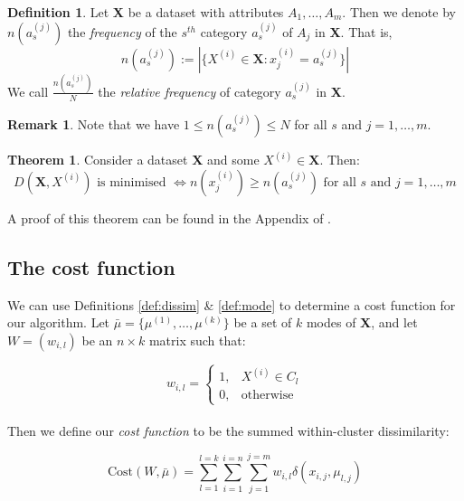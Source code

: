 \documentclass{article}
\theoremstyle{definition}
\newtheorem{definition}{Definition}[section]
\newtheorem{theorem}{Theorem}
\newtheorem*{remark}{Remark}
\begin{document}
\begin{definition}\label{def:rel-freq}
Let \textbf{X} be a dataset with attributes $A_1, \ldots, A_m$. Then we denote by $n(a_s^{(j)})$ the \emph{frequency} of the $s^{th}$ category $a_s^{(j)}$ of $A_j$ in \textbf{X}. That is, 
\[
	n(a_s^{(j)}) := |{\{X^{(i)} \in \textbf{X}: x_j^{(i)} = a_s^{(j)}\}}|
\]
We call $\frac{n(a_s^{(j)})}{N}$ the \emph{relative frequency} of category $a_s^{(j)}$ in \textbf{X}.
\end{definition}

\begin{remark}
	Note that we have $1 \le n(a_s^{(j)}) \le N$ for all $s$ and $j = 1, \ldots, m$. \\
\end{remark}

\begin{theorem}\label{theorem:1}
Consider a dataset \textbf{X} and some $X^{(i)} \in \textbf{X}$. Then: \\
\[
	D(\textbf{X}, X^{(i)}) \text{ is minimised } \iff n(x_j^{(i)}) \geq n(a_s^{(j)}) \text{ for all } s \text{ and } j = 1, \ldots, m 
\]
\end{theorem}
A proof of this theorem can be found in the Appendix of \cite{Huang98}. \\


\subsection{The cost function}\label{subsection:cost}

We can use Definitions \ref{def:dissim} \& \ref{def:mode} to determine a cost function for our algorithm. Let $\bar{\mu} = \{\mu^{(1)}, \ldots, \mu^{(k)}\}$ be a set of $k$ modes of \textbf{X}, and let $W = (w_{i,l})$ be an $n \times k$ matrix such that:

\[ 
w_{i,l} = \begin{cases}
                1, & X^{(i)} \in C_l \\
                0, & \text{otherwise}
          	 \end{cases}
\] \\

Then we define our \emph{cost function} to be the summed within-cluster dissimilarity:

\begin{equation}
	\text{Cost}(W, \bar{\mu}) = \sum_{l=1}^{l=k}\sum_{i=1}^{i=n}\sum_{j=1}^{j=m} w_{i,l} \delta(x_{i,j}, \mu_{l,j}) 
\end{equation}
\end{document}
